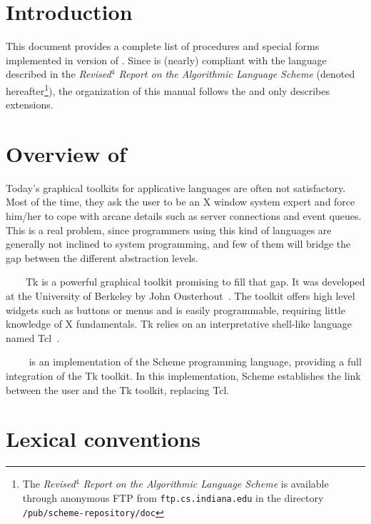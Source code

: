 %
%
%

\section*{Introduction}

This document provides a complete list of procedures and special forms
implemented in version {\stkversion} of {\stk}. Since {\stk} is (nearly) 
compliant with the language described in the {\em Revised$^{4}$ Report on the
Algorithmic Language Scheme} (denoted {\rrrr} hereafter{\footnote{The {\em
Revised$^{4}$ Report on the Algorithmic Language Scheme} is available
through anonymous FTP from {\tt ftp.cs.indiana.edu} in the directory
{\tt /pub/scheme-repository/doc}}})\cite{R4RS}, the organization of
this manual follows the {\rrrr} and only describes extensions.

\section{Overview of \stk}

Today's graphical toolkits for applicative languages are often not
satisfactory. Most of the time, they ask the user to be an X window system
 expert and force him/her to cope with arcane
details such as server connections and event queues. This is a real
problem, since programmers using this kind of languages are generally not
inclined to system programming, and few of them will bridge the gap between
the different abstraction levels.

~~~~Tk is a powerful graphical tool\-kit
promising to fill that gap. It was developed at the University of Berkeley
by John Ousterhout~\cite{Ouster-Tk}. The toolkit offers high level widgets
such as buttons or menus and is easily programmable, requiring little
knowledge of X fundamentals. Tk relies on an interpretative shell-like
language named Tcl~\cite{Ouster-Tcl}.

~~~~{\stk} is an implementation of the Scheme programming language,
providing a full integration of the Tk toolkit. In this implementation,
Scheme establishes the link between the user and the Tk toolkit, replacing
Tcl.


\section{Lexical conventions}

